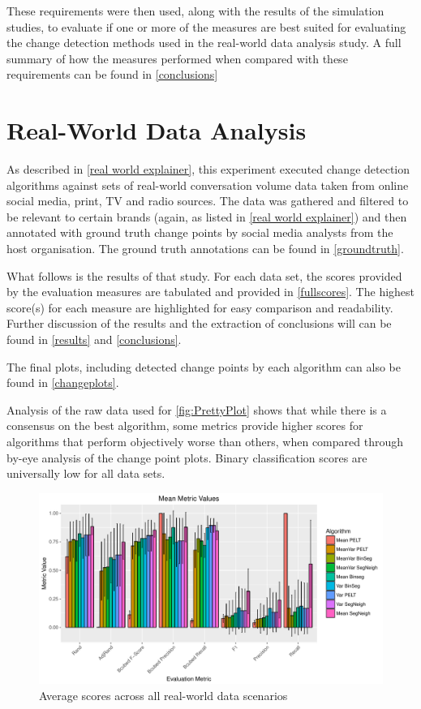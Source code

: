 \documentclass[../main.tex]{subfiles}
\begin{document}
These requirements were then used, along with the results of the simulation studies, to evaluate if one or more of the measures are best suited for evaluating the change detection methods used in the real-world data analysis study. A full summary of how the measures performed when compared with these requirements can be found in \autoref{conclusions}

\section{Real-World Data Analysis}

As described in \autoref{real world explainer}, this experiment executed change detection algorithms against sets of real-world conversation volume data taken from online social media, print, TV and radio sources. The data was gathered and filtered to be relevant to certain brands (again, as listed in \autoref{real world explainer}) and then annotated with ground truth change points by social media analysts from the host organisation. The ground truth annotations can be found in \autoref{groundtruth}.

What follows is the results of that study. For each data set, the scores provided by the evaluation measures are tabulated and provided in \autoref{fullscores}. The highest score(s) for each measure are highlighted for easy comparison and readability. Further discussion of the results and the extraction of conclusions will can be found in \autoref{results} and \autoref{conclusions}.

\pagebreak

The final plots, including detected change points by each algorithm can also be found in \autoref{changeplots}.

Analysis of the raw data used for \autoref{fig:PrettyPlot} shows that while there is a consensus on the best algorithm, some metrics provide higher scores for algorithms that perform objectively worse than others, when compared through by-eye analysis of the change point plots. Binary classification scores are universally low for all data sets.

\begin{figure}[h]
    \includegraphics[width=\textwidth]{figures/PrettyPlot2}
    \caption{Average scores across all real-world data scenarios}
    \label{fig:PrettyPlot}
\end{figure}
\end{document}
